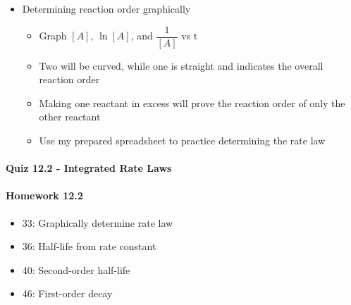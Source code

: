 \documentclass[12pt, openany, letterpaper]{memoir}
\begin{document}
\begin{itemize}
  \item Determining reaction order graphically
    \begin{itemize}
      \item Graph $[A]$, $\ln[A]$, and $\dfrac{1}{[A]}$ vs t
      \item Two will be curved, while one is straight and indicates the overall reaction order
      \item Making one reactant in excess will prove the reaction order of only the other reactant
      \item Use my prepared spreadsheet to practice determining the rate law
    \end{itemize}
\end{itemize}

\paragraph*{Quiz 12.2 - Integrated Rate Laws}
\paragraph*{Homework 12.2}
\begin{itemize}
  \item 33: Graphically determine rate law
  \item 36: Half-life from rate constant
  \item 40: Second-order half-life
  \item 46: First-order decay 
\end{itemize}
\end{document}
